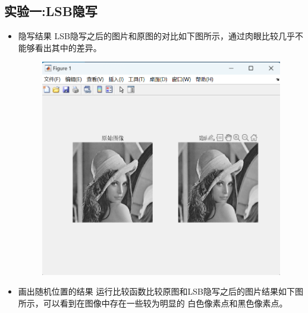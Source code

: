 \documentclass[a4paper,11pt,UTF8]{ctexart}
\newcommand{\bottomcaption}{%
\setlength{\abovecaptionskip}{6pt}%
\setlength{\belowcaptionskip}{6pt}%
\caption}
\newcommand{\xiaowuhao}{\fontsize{9pt}{\baselineskip}\selectfont}   %
\begin{document}
  \subsection{实验一:LSB隐写}
    \begin{itemize}
      \item 隐写结果
        LSB隐写之后的图片和原图的对比如下图所示，通过肉眼比较几乎不能够看出其中的差异。
        \begin{figure}[!htbp]
        \centering
        \includegraphics[width=\textwidth]{LSB_result1.png}
        \bottomcaption{\xiaowuhao{LSB隐写前后图像}}
        \end{figure}
\newpage
      \item 画出随机位置的结果
        运行比较函数比较原图和LSB隐写之后的图片结果如下图所示，可以看到在图像中存在一些较为明显的
        白色像素点和黑色像素点。
        \begin{figure}[!htbp]
        \centering

\end{figure}
\end{itemize}
\end{document}
